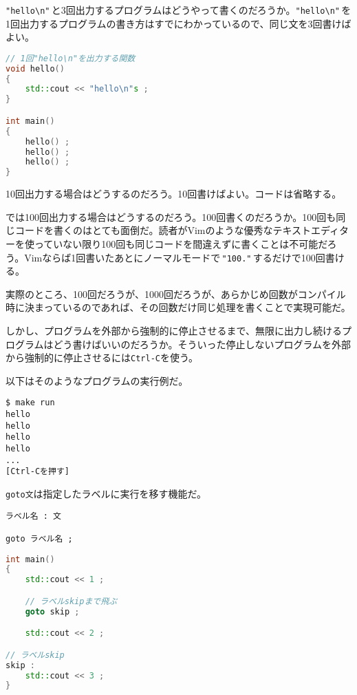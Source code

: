 
\texttt{"hello{\textbackslash}n"}\,と3回出力するプログラムはどうやって書くのだろうか。\texttt{"hello{\textbackslash}n"}\,を1回出力するプログラムの書き方はすでにわかっているので、同じ文を3回書けばよい。

\begin{lstlisting}[language={C++}]
// 1回"hello\n"を出力する関数
void hello()
{
    std::cout << "hello\n"s ;
}

int main()
{
    hello() ;
    hello() ;
    hello() ;
}
\end{lstlisting}

10回出力する場合はどうするのだろう。10回書けばよい。コードは省略する。

では100回出力する場合はどうするのだろう。100回書くのだろうか。100回も同じコードを書くのはとても面倒だ。読者がVimのような優秀なテキストエディターを使っていない限り100回も同じコードを間違えずに書くことは不可能だろう。Vimならば1回書いたあとにノーマルモードで\,\texttt{"100."}\,するだけで100回書ける。

実際のところ、100回だろうが、1000回だろうが、あらかじめ回数がコンパイル時に決まっているのであれば、その回数だけ同じ処理を書くことで実現可能だ。

しかし、プログラムを外部から強制的に停止させるまで、無限に出力し続けるプログラムはどう書けばいいのだろうか。そういった停止しないプログラムを外部から強制的に停止させるには\texttt{Ctrl-C}を使う。

以下はそのようなプログラムの実行例だ。

\begin{lstlisting}[style=terminal]
$ make run
hello
hello
hello
hello
...
[Ctrl-Cを押す]
\end{lstlisting}

\texttt{goto文}は指定したラベルに実行を移す機能だ。

\begin{lstlisting}[style=grammar]
ラベル名 : 文

goto ラベル名 ;
\end{lstlisting}

\begin{lstlisting}[language={C++}]
int main()
{
    std::cout << 1 ;

    // ラベルskipまで飛ぶ
    goto skip ;

    std::cout << 2 ;

// ラベルskip
skip :
    std::cout << 3 ;
}
\end{lstlisting}

